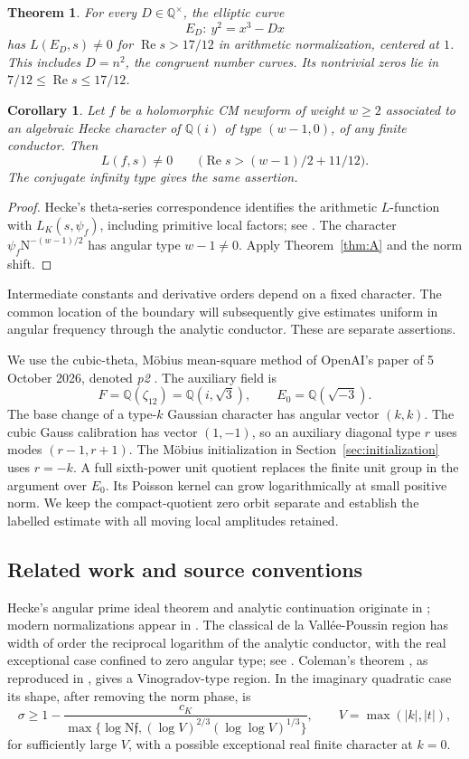 \documentclass[11pt,a4paper]{article}
\numberwithin{equation}{section}
\newtheorem{maintheorem}{Theorem}
\newtheorem{corollary}[theorem]{Corollary}
\theoremstyle{definition}
\theoremstyle{remark}
\newcommand{\Q}{\mathbb Q}
\newcommand{\N}{\mathrm N}
\newcommand{\Rea}{\operatorname{Re}}
\begin{document}
\begin{maintheorem}\label{thm:B}
For every $D\in\Q^\times$, the elliptic curve
\[
 E_D:\ y^2=x^3-Dx
\]
has $L(E_D,s)\ne0$ for $\Rea s>17/12$ in arithmetic normalization, centered at $1$. This includes $D=n^2$, the congruent number curves. Its nontrivial zeros lie in $7/12\le\Rea s\le17/12$.
\end{maintheorem}

\begin{corollary}\label{cor:newforms}
Let $f$ be a holomorphic CM newform of weight $w\ge2$ associated to an algebraic Hecke character of $\Q(i)$ of type $(w-1,0)$, of any finite conductor. Then
\[
 L(f,s)\ne0\qquad\bigl(\Rea s>(w-1)/2+11/12\bigr).
\]
The conjugate infinity type gives the same assertion.
\end{corollary}
\begin{proof}
Hecke's theta-series correspondence identifies the arithmetic $L$-function with $L_K(s,\psi_f)$, including primitive local factors; see \cite[Theorem 12.5 and the following remark]{Iwaniec}. The character $\psi_f\N^{-(w-1)/2}$ has angular type $w-1\ne0$. Apply Theorem~\ref{thm:A} and the norm shift.
\end{proof}

Intermediate constants and derivative orders depend on a fixed character. The common location of the boundary will subsequently give estimates uniform in angular frequency through the analytic conductor. These are separate assertions.

We use the cubic-theta, M\"obius mean-square method of OpenAI's paper of 5 October 2026, denoted \emph{p2} \cite{QRH12}. The auxiliary field is
\[
 F=\Q(\zeta_{12})=\Q(i,\sqrt3),\qquad E_0=\Q(\sqrt{-3}).
\]
The base change of a type-$k$ Gaussian character has angular vector $(k,k)$. The cubic Gauss calibration has vector $(1,-1)$, so an auxiliary diagonal type $r$ uses modes $(r-1,r+1)$. The M\"obius initialization in Section~\ref{sec:initialization} uses $r=-k$. A full sixth-power unit quotient replaces the finite unit group in the argument over $E_0$. Its Poisson kernel can grow logarithmically at small positive norm. We keep the compact-quotient zero orbit separate and establish the labelled estimate with all moving local amplitudes retained.

\subsection{Related work and source conventions}\label{sec:related}
Hecke's angular prime ideal theorem and analytic continuation originate in \cite{Hecke}; modern normalizations appear in \cite{Tate,Watkins}. The classical de la Vall\'ee-Poussin region has width of order the reciprocal logarithm of the analytic conductor, with the real exceptional case confined to zero angular type; see \cite[Lemma 2.1]{CPS}. Coleman's theorem \cite[Theorem 2]{Coleman}, as reproduced in \cite[Theorem 2.5]{Khale}, gives a Vinogradov-type region. In the imaginary quadratic case its shape, after removing the norm phase, is
\[
 \sigma\ge1-\frac{c_K}
 {\max\{\log\N\mathfrak f,(\log V)^{2/3}(\log\log V)^{1/3}\}},
 \qquad V=\max(|k|,|t|),
\]
for sufficiently large $V$, with a possible exceptional real finite character at $k=0$.
\end{document}
